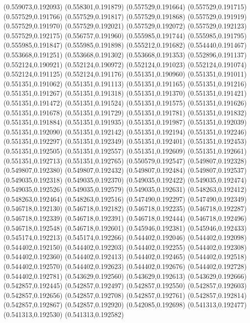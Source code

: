 (0.559073,0.192093)
(0.558301,0.191879)
(0.557529,0.191664)
(0.557529,0.191715)
(0.557529,0.191766)
(0.557529,0.191817)
(0.557529,0.191868)
(0.557529,0.191919)
(0.557529,0.191970)
(0.557529,0.192021)
(0.557529,0.192072)
(0.557529,0.192123)
(0.557529,0.192175)
(0.556757,0.191960)
(0.555985,0.191744)
(0.555985,0.191795)
(0.555985,0.191847)
(0.555985,0.191898)
(0.555212,0.191682)
(0.554440,0.191467)
(0.553668,0.191251)
(0.553668,0.191302)
(0.553668,0.191353)
(0.552896,0.191137)
(0.552124,0.190921)
(0.552124,0.190972)
(0.552124,0.191023)
(0.552124,0.191074)
(0.552124,0.191125)
(0.552124,0.191176)
(0.551351,0.190960)
(0.551351,0.191011)
(0.551351,0.191062)
(0.551351,0.191113)
(0.551351,0.191165)
(0.551351,0.191216)
(0.551351,0.191267)
(0.551351,0.191318)
(0.551351,0.191370)
(0.551351,0.191421)
(0.551351,0.191472)
(0.551351,0.191524)
(0.551351,0.191575)
(0.551351,0.191626)
(0.551351,0.191678)
(0.551351,0.191729)
(0.551351,0.191781)
(0.551351,0.191832)
(0.551351,0.191884)
(0.551351,0.191935)
(0.551351,0.191987)
(0.551351,0.192039)
(0.551351,0.192090)
(0.551351,0.192142)
(0.551351,0.192194)
(0.551351,0.192246)
(0.551351,0.192297)
(0.551351,0.192349)
(0.551351,0.192401)
(0.551351,0.192453)
(0.551351,0.192505)
(0.551351,0.192557)
(0.551351,0.192609)
(0.551351,0.192661)
(0.551351,0.192713)
(0.551351,0.192765)
(0.550579,0.192547)
(0.549807,0.192328)
(0.549807,0.192380)
(0.549807,0.192432)
(0.549807,0.192484)
(0.549807,0.192537)
(0.549035,0.192318)
(0.549035,0.192370)
(0.549035,0.192422)
(0.549035,0.192474)
(0.549035,0.192526)
(0.549035,0.192579)
(0.549035,0.192631)
(0.548263,0.192412)
(0.548263,0.192464)
(0.548263,0.192516)
(0.547490,0.192297)
(0.547490,0.192349)
(0.546718,0.192130)
(0.546718,0.192182)
(0.546718,0.192235)
(0.546718,0.192287)
(0.546718,0.192339)
(0.546718,0.192391)
(0.546718,0.192444)
(0.546718,0.192496)
(0.546718,0.192548)
(0.546718,0.192601)
(0.545946,0.192381)
(0.545946,0.192433)
(0.545174,0.192213)
(0.545174,0.192266)
(0.544402,0.192046)
(0.544402,0.192098)
(0.544402,0.192150)
(0.544402,0.192203)
(0.544402,0.192255)
(0.544402,0.192308)
(0.544402,0.192360)
(0.544402,0.192413)
(0.544402,0.192465)
(0.544402,0.192518)
(0.544402,0.192570)
(0.544402,0.192623)
(0.544402,0.192676)
(0.544402,0.192728)
(0.544402,0.192781)
(0.543629,0.192560)
(0.543629,0.192613)
(0.543629,0.192666)
(0.542857,0.192445)
(0.542857,0.192497)
(0.542857,0.192550)
(0.542857,0.192603)
(0.542857,0.192656)
(0.542857,0.192708)
(0.542857,0.192761)
(0.542857,0.192814)
(0.542857,0.192867)
(0.542857,0.192920)
(0.542085,0.192698)
(0.541313,0.192477)
(0.541313,0.192530)
(0.541313,0.192582)

